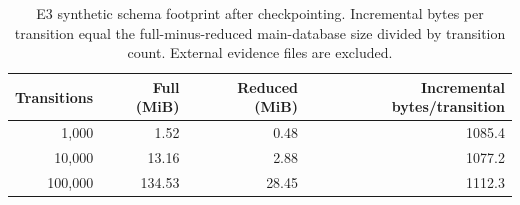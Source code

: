 \begin{table}[tb]
\centering
\small
\caption{E3 synthetic schema footprint after checkpointing. Incremental bytes per transition equal the full-minus-reduced main-database size divided by transition count. External evidence files are excluded.}
\label{tab:storage-cost}
\begin{tabular}{@{}rrrr@{}}
\toprule
Transitions & Full (MiB) & Reduced (MiB) & Incremental bytes/transition \\
\midrule
1,000 & 1.52 & 0.48 & 1085.4 \\
10,000 & 13.16 & 2.88 & 1077.2 \\
100,000 & 134.53 & 28.45 & 1112.3 \\
\bottomrule
\end{tabular}
\end{table}
